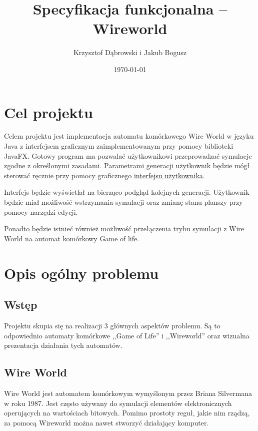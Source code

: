 \documentclass{report}
\title{Specyfikacja funkcjonalna -- Wireworld}
\author{Krzysztof Dąbrowski i Jakub Bogusz}
\date{\today}
\begin{document}
\maketitle{}

\tableofcontents{}

\chapter{Cel projektu}
Celem projektu jest implementacja automatu komórkowego Wire World w języku Java z interfejsem graficznym zaimplementowanym przy pomocy biblioteki JavaFX. Gotowy program ma pozwalać użytkownikowi przeprowadzać symulacje zgodne z określonymi zasadami. Parametrami generacji użytkownik będzie mógł sterować ręcznie przy pomocy graficznego \hyperref[sec:wyglad-gui]{\textcolor{LinkColor}{interfejsu użytkownika}}.

Interfejs będzie wyświetlał na bierząco podgląd kolejnych generacji. Użytkownik będzie miał możliwość wstrzymania symulacji oraz zmianę stanu planszy przy pomocy narzędzi edycji.

Ponadto będzie istnieć również możliwość przełączenia trybu symulacji z Wire World na automat komórkowy Game of life.

\chapter{Opis ogólny problemu}

\section{Wstęp}
Projektu skupia się na realizacji 3 głównych aspektów problemu. Są to odpowiednio automaty komórkowe ,,Game of Life'' i ,,Wireworld'' oraz wizualna prezentacja działania tych automatów. 

\section{Wire World}

Wire World jest automatem komórkowym wymyślonym przez Briana Silvermana w roku 1987.  Jest często używany do symulacji elementów elektronicznych operujących na wartościach bitowych. Pomimo prostoty reguł, jakie nim rządzą, za pomocą Wireworld można nawet stworzyć działający komputer.
\end{document}
